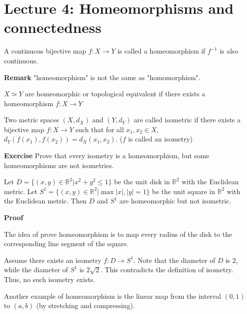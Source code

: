 \documentclass[main.tex]{subfiles}
\begin{document}
\pagestyle{plain}
\setcounter{chapter}{3}

\chapter{Lecture 4: Homeomorphisms and connectedness}
\label{chap:chapter4}

\begin{definition}
    A continuous bijective map $f: X \rightarrow Y$ is called a homeomorphism if $f^{-1} $ is also continuous. 
\end{definition}
\par \noindent \textbf{Remark} "homeomorphism" is not the same as "homomorphism".  
\begin{definition}
    $X \simeq Y$ are homeomorphic or topological equivalent if there exists a homeomorphism $f: X \rightarrow Y$
\end{definition}

\begin{definition}
    Two metric spaces $(X,d_X)$ and $(Y,d_Y)$ are called isometric if there exists a bijective map $f: X \rightarrow Y$ such that for all $x_1, x_2 \in X$, $d_Y(f(x_1), f(x_2)) = d_X(x_1, x_2)$. ($f$ is called an isometry)
\end{definition}
\par \noindent \textbf{Exercise} Prove that every isometry is a homeomorphism, but some homeomorphisms are not isometries. 
\begin{example}
    Let $D = \{(x,y) \in \mathbb{R}^2 | x^2 + y^2 \leq 1\}$ be the unit disk in $\mathbb{R}^2$ with the Euclidean metric. Let $S^1 = \{(x,y) \in \mathbb{R}^2 | \max{|x|, |y|} = 1\}$ be the unit square in $\mathbb{R}^2$ with the Euclidean metric. Then $D$ and $S^1$ are homeomorphic but not isometric.
\end{example}
\par \noindent \textbf{Proof}
\par The idea of prove homeomorphism is to map every radius of the disk to the corresponding line segment of the square. 

\par Assume there exists an isometry $f: D \rightarrow S^1$. Note that the diameter of $D$ is $2$, while the diameter of $S^1$ is $2\sqrt{2}$. This contradicts the definition of isometry. Thus, no such isometry exists. 

\begin{example}
    Another example of homeomorphism is the linear map from the interval $(0, 1)$ to $(a, b)$ (by stretching and compressing).
\end{example}
\end{document}
